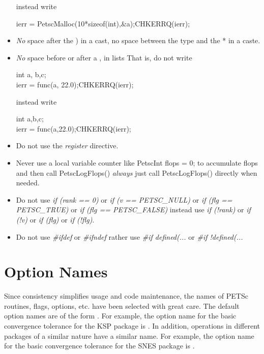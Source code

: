\documentclass[twoside,12pt]{../sty/report_petsc}
\begin{document}
\begin{itemize}
\begin{tabbing}
\end{tabbing}
instead write
\begin{tabbing}
   ierr = PetscMalloc(10*sizeof(int),\&a);CHKERRQ(ierr);
\end{tabbing}
\item {\em No} space after the ) in a cast, no space between the type and the * in a caste.
\item {\em No} space before or after a , in lists
That is, do not write
\begin{tabbing}
    int a, b,c;\\
    ierr = func(a, 22.0);CHKERRQ(ierr);
\end{tabbing}
instead write
\begin{tabbing}
    int a,b,c;\\
    ierr = func(a,22.0);CHKERRQ(ierr);
\end{tabbing}

\item Do not use the {\em register} directive.
\item Never use a local variable counter like PetscInt flops = 0; to accumulate flops and then call PetscLogFlops() {\em always} just
      call PetscLogFlops() directly when needed.
\item Do not use {\em if (rank == 0)} or {\em if (v == PETSC\_NULL)} or {\em if (flg == PETSC\_TRUE)} or {\em if (flg == PETSC\_FALSE)} 
instead use {\em if (!rank)} or {\em if (!v)} or {\em if (flg)} or {\em if (!flg)}.
\item Do not use {\em \#ifdef} or {\em \#ifndef} rather use {\em \#if defined(...} or {\em \#if !defined(...}
\end{itemize}

\section{Option Names}

Since consistency simplifies usage and code maintenance, the names of
PETSc routines, flags, options, etc. have been selected with great care.
The default option names are of the form .  
For example, the option name for the basic convergence tolerance for 
the KSP package is . In addition, operations in different 
packages of a similar nature have a similar name.  For example, the option
name for the basic convergence tolerance for the SNES package is 
.

\end{document}
